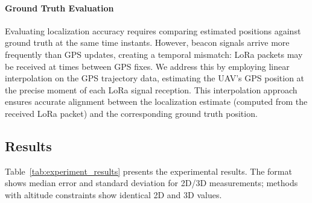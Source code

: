 \documentclass[master,final,11pt]{iscs-thesis}
\begin{document}
\paragraph{Ground Truth Evaluation}
Evaluating localization accuracy requires comparing estimated positions against ground truth at the same time instants.
However, beacon signals arrive more frequently than GPS updates, creating a temporal mismatch: LoRa packets may be received at times between GPS fixes.
We address this by employing linear interpolation on the GPS trajectory data, estimating the UAV's GPS position at the precise moment of each LoRa signal reception.
This interpolation approach ensures accurate alignment between the localization estimate (computed from the received LoRa packet) and the corresponding ground truth position.

\subsection{Results}

Table~\ref{tab:experiment_results} presents the experimental results.
The format shows median error and standard deviation for 2D/3D measurements; methods with altitude constraints show identical 2D and 3D values.

\begin{table}[htbp]
\centering
\caption{Experimental results (meters)}
\label{tab:experiment_results}
\end{table}
\end{document}
